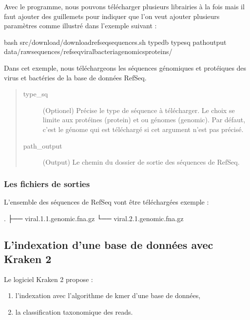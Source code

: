 \documentclass[letterpaper,10pt,french]{sphinxmanual}
\begin{document}
Avec le programme, nous pouvons télécharger plusieurs librairies à la fois mais il faut ajouter des guillemets pour indiquer que l’on veut ajouter plusieurs paramètres comme illustré dans l’exemple suivant :

\begin{sphinxVerbatim}[commandchars=\\\{\}]
bash src/download/download\PYGZus{}refseq\PYGZus{}sequences.sh 
        \PYGZhy{}type\PYGZus{}db  
        \PYGZhy{}type\PYGZus{}sq  
        \PYGZhy{}path\PYGZus{}output data/raw\PYGZus{}sequences/refseq\PYGZus{}viral\PYGZus{}bacteria\PYGZus{}genomics\PYGZus{}proteins/
\end{sphinxVerbatim}

Dans cet exemple, nous téléchargeons les séquences génomiques et protéiques des virus et bactéries de la base de données RefSeq.
\begin{quote}\begin{description}
\item[{\sphinxhyphen{}type\_sq}] \leavevmode
(Optionel) Précise le type de séquence à télécharger. Le choix se limite aux protéines (protein) et ou génomes (genomic). Par défaut, c’est le génome qui est téléchargé si cet argument n’est pas précisé.

\item[{\sphinxhyphen{}path\_output}] \leavevmode
(Output) Le chemin du dossier de sortie des séquences de RefSeq.

\end{description}\end{quote}


\subsubsection{Les fichiers de sorties}
\label{\detokenize{tutorial:id18}}
L’ensemble des séquences de RefSeq vont être téléchargées exemple :

\begin{sphinxVerbatim}[commandchars=\\\{\}]
.
├── viral.1.1.genomic.fna.gz
└── viral.2.1.genomic.fna.gz
\end{sphinxVerbatim}


\subsection{L’indexation d’une base de données avec Kraken 2}
\label{\detokenize{tutorial:l-indexation-d-une-base-de-donnees-avec-kraken-2}}\label{\detokenize{tutorial:indexation-kraken2}}
Le logiciel Kraken 2 propose :
\begin{enumerate}
%
\item {} 
l’indexation avec l’algorithme de k\sphinxhyphen{}mer d’une base de données,

\item {} 
la classification taxonomique des reads.

\end{enumerate}
\end{document}
